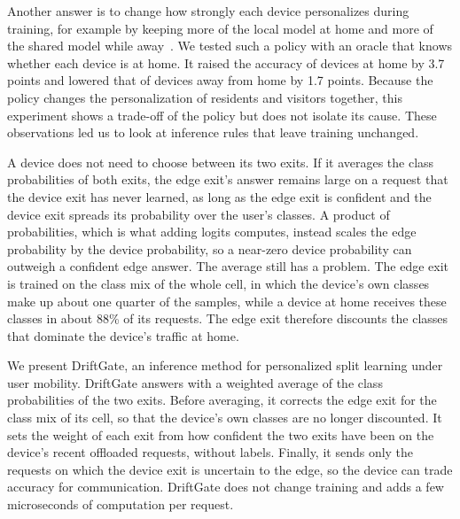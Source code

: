 Another answer is to change how strongly each device personalizes during training, for example by keeping more of the local model at home and more of the shared model while away~\cite{deng2020apfl}. We tested such a policy with an oracle that knows whether each device is at home. It raised the accuracy of devices at home by 3.7 points and lowered that of devices away from home by 1.7 points. Because the policy changes the personalization of residents and visitors together, this experiment shows a trade-off of the policy but does not isolate its cause. These observations led us to look at inference rules that leave training unchanged.

A device does not need to choose between its two exits. If it averages the class probabilities of both exits, the edge exit's answer remains large on a request that the device exit has never learned, as long as the edge exit is confident and the device exit spreads its probability over the user's classes. A product of probabilities, which is what adding logits computes, instead scales the edge probability by the device probability, so a near-zero device probability can outweigh a confident edge answer. The average still has a problem. The edge exit is trained on the class mix of the whole cell, in which the device's own classes make up about one quarter of the samples, while a device at home receives these classes in about 88\% of its requests. The edge exit therefore discounts the classes that dominate the device's traffic at home.

We present DriftGate, an inference method for personalized split learning under user mobility. DriftGate answers with a weighted average of the class probabilities of the two exits. Before averaging, it corrects the edge exit for the class mix of its cell, so that the device's own classes are no longer discounted. It sets the weight of each exit from how confident the two exits have been on the device's recent offloaded requests, without labels. Finally, it sends only the requests on which the device exit is uncertain to the edge, so the device can trade accuracy for communication. DriftGate does not change training and adds a few microseconds of computation per request.

